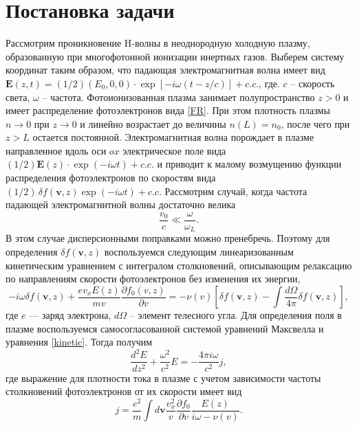 \documentclass[12pt,a4paper]{article}
\numberwithin{equation}{section}
\begin{document}
\section{Постановка задачи}
Рассмотрим проникновение H-волны в неоднородную холодную плазму, образованную при многофотонной ионизации инертных газов. Выберем систему координат таким образом, что падающая электромагнитная волна имеет вид $\bm{E}\left(z,t\right) =(1/2)\left(E_0,0,0\right)\cdot\exp\left[-i\omega\left(t-z/c\right)\right]+c.c.$, где. $c$ -- скорость света,  $\omega$ -- частота. Фотоионизованная плазма занимает полупространство $z>0$ и имеет распределение фотоэлектронов вида \eqref{FR}. При этом плотность плазмы $n\to 0$ при $z\to0$ и линейно возрастает до величины $n\left(L\right) = n_0$, после чего при $z>L$ остается постоянной.  Электромагнитная волна порождает в плазме направленное вдоль оси $ox$ электрическое поле вида $(1/2)\bm{E}\left(z\right)\cdot\exp\left(-i\omega t\right)+c.c.$ и приводит к малому возмущению функции распределения фотоэлектронов по скоростям вида $(1/2)\,\delta f(\mathbf v,z)\exp\left(-i\omega t\right)+c.c$. Рассмотрим случай, когда частота падающей электромагнитной волны достаточно велика $$ \frac{v_0}{c}\ll \frac{\omega}{\omega_L}.$$ В этом случае дисперсионными поправками можно пренебречь. Поэтому для определения $\delta f\left(\mathbf v,z\right)$ воспользуемся следующим линеаризованным кинетическим уравнением с интегралом столкновений, описывающим релаксацию по направлениям скорости фотоэлектронов без изменения их энергии,
\begin{equation}
\label{kinetic}
    -i\omega\delta f(\mathbf v,z)+\frac{ev_x E\left(z\right)}{mv}\frac{\partial f_0(v, z)}{\partial v}= -\nu\left(v\right) \left[\delta f(\mathbf v,z)-\int \frac{d\Omega}{4\pi}\delta f(\mathbf v,z)\right],
\end{equation}
где $e$ — заряд электрона, $d\Omega$ -- элемент телесного угла.
Для определения поля в плазме воспользуемся самосогласованной системой уравнений Максвелла и уравнения \eqref{kinetic}. Тогда получим
\begin{equation}
    \label{field}
    \frac{d^2E}{dz^2}+\frac{\omega^2}{c^2}E = -\frac{4\pi i \omega}{c^2}j,
\end{equation}
где выражение для плотности тока в плазме с учетом зависимости частоты столкновений фотоэлектронов от их скорости имеет вид
\begin{equation}
    \label{current}
    j = \frac{e^2}{m} \int d\bm{v} \frac{v_x^2}{v}\frac{\partial f_0}{\partial v} \frac{E\left(z\right)}{i\omega-\nu\left(v\right)}.
\end{equation}
\end{document}

